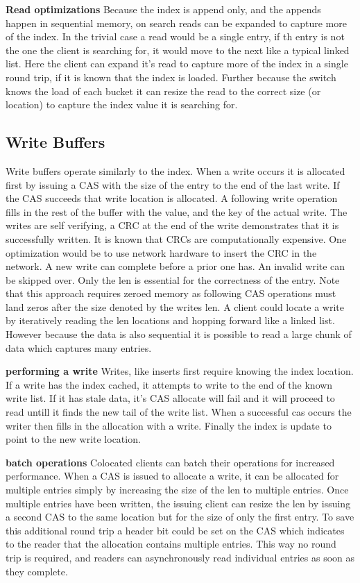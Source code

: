 \textbf{Read optimizations} Because the index is append only, and the appends
happen in sequential memory, on search reads can be expanded to capture more of
the index. In the trivial case a read would be a single entry, if th entry is
not the one the client is searching for, it would move to the next like a
typical linked list. Here the client can expand it's read to capture more of the
index in a single round trip, if it is known that the index is loaded. Further
because the switch knows the load of each bucket it can resize the read to the
correct size (or location) to capture the index value it is searching for.

\subsection{Write Buffers} Write buffers operate similarly to the index. When a
write occurs it is allocated first by issuing a CAS with the size of the entry
to the end of the last write. If the CAS succeeds that write location is
allocated. A following write operation fills in the rest of the buffer with the
value, and the key of the actual write. The writes are self verifying, a CRC at
the end of the write demonstrates that it is successfully written. It is known
that CRCs are computationally expensive. One optimization would be to use
network hardware to insert the CRC in the network. A new write can complete
before a prior one has. An invalid write can be skipped over. Only the len is
essential for the correctness of the entry. Note that this approach requires
zeroed memory as following CAS operations must land zeros after the size denoted
by the writes len. A client could locate a write by iteratively reading the len
locations and hopping forward like a linked list. However because the data is
also sequential it is possible to read a large chunk of data which captures many
entries.

\textbf{performing a write} Writes, like inserts first require knowing the index
location. If a write has the index cached, it attempts to write to the end of
the known write list. If it has stale data, it's CAS allocate will fail and it
will proceed to read untill it finds the new tail of the write list. When a
successful cas occurs the writer then fills in the allocation with a write.
Finally the index is update to point to the new write location.

\textbf{batch operations} Colocated clients can batch their operations for
increased performance. When a CAS is issued to allocate a write, it can be
allocated for multiple entries simply by increasing the size of the len to
multiple entries. Once multiple entries have been written, the issuing client
can resize the len by issuing a second CAS to the same location but for the size
of only the first entry. To save this additional round trip a header bit could
be set on the CAS which indicates to the reader that the allocation contains
multiple entries. This way no round trip is required, and readers can
asynchronously read individual entries as soon as they complete.

